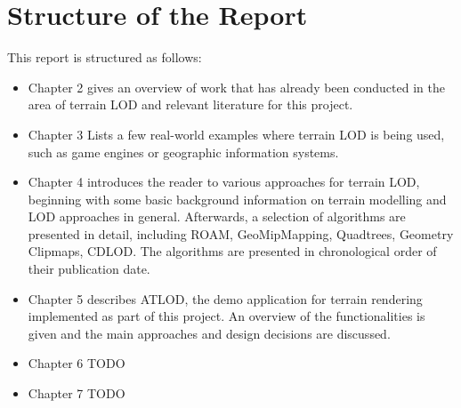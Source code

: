 \section{Structure of the Report}
This report is structured as follows:
\begin{itemize}
  \item Chapter 2 gives an overview of work that has already been conducted in the area of terrain LOD
        and relevant literature for this project.
  \item Chapter 3 Lists a few real-world examples where terrain LOD is being used, such as 
        game engines or geographic information systems.
  \item Chapter 4 introduces the reader to various approaches for terrain LOD, beginning with some basic background
        information on terrain modelling and LOD approaches in general. Afterwards, a selection of algorithms
        are presented in detail, including ROAM, GeoMipMapping, Quadtrees, Geometry Clipmaps, CDLOD. The algorithms are presented in chronological order of their publication date.
  \item Chapter 5 describes ATLOD, the demo application for terrain rendering implemented as part of this project.
        An overview of the functionalities is given and the main approaches and design decisions are discussed.
  \item Chapter 6 TODO
  \item Chapter 7 TODO 
\end{itemize}


